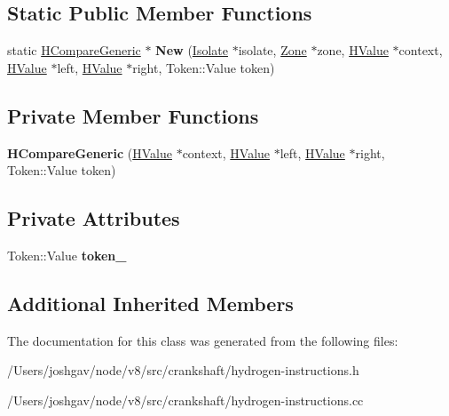 \subsection*{Static Public Member Functions}
\begin{DoxyCompactItemize}
\item 
static \hyperlink{classv8_1_1internal_1_1_h_compare_generic}{H\+Compare\+Generic} $\ast$ {\bfseries New} (\hyperlink{classv8_1_1internal_1_1_isolate}{Isolate} $\ast$isolate, \hyperlink{classv8_1_1internal_1_1_zone}{Zone} $\ast$zone, \hyperlink{classv8_1_1internal_1_1_h_value}{H\+Value} $\ast$context, \hyperlink{classv8_1_1internal_1_1_h_value}{H\+Value} $\ast$left, \hyperlink{classv8_1_1internal_1_1_h_value}{H\+Value} $\ast$right, Token\+::\+Value token)\hypertarget{classv8_1_1internal_1_1_h_compare_generic_a856a1192a77fb9fc46c5257bd2743fb9}{}\label{classv8_1_1internal_1_1_h_compare_generic_a856a1192a77fb9fc46c5257bd2743fb9}

\end{DoxyCompactItemize}
\subsection*{Private Member Functions}
\begin{DoxyCompactItemize}
\item 
{\bfseries H\+Compare\+Generic} (\hyperlink{classv8_1_1internal_1_1_h_value}{H\+Value} $\ast$context, \hyperlink{classv8_1_1internal_1_1_h_value}{H\+Value} $\ast$left, \hyperlink{classv8_1_1internal_1_1_h_value}{H\+Value} $\ast$right, Token\+::\+Value token)\hypertarget{classv8_1_1internal_1_1_h_compare_generic_a8304e6880b8b6d77c0ef668fcdb7eff5}{}\label{classv8_1_1internal_1_1_h_compare_generic_a8304e6880b8b6d77c0ef668fcdb7eff5}

\end{DoxyCompactItemize}
\subsection*{Private Attributes}
\begin{DoxyCompactItemize}
\item 
Token\+::\+Value {\bfseries token\+\_\+}\hypertarget{classv8_1_1internal_1_1_h_compare_generic_a54bb5c3327ee11b535ad89ecfef1ffd2}{}\label{classv8_1_1internal_1_1_h_compare_generic_a54bb5c3327ee11b535ad89ecfef1ffd2}

\end{DoxyCompactItemize}
\subsection*{Additional Inherited Members}


The documentation for this class was generated from the following files\+:\begin{DoxyCompactItemize}
\item 
/\+Users/joshgav/node/v8/src/crankshaft/hydrogen-\/instructions.\+h\item 
/\+Users/joshgav/node/v8/src/crankshaft/hydrogen-\/instructions.\+cc\end{DoxyCompactItemize}
